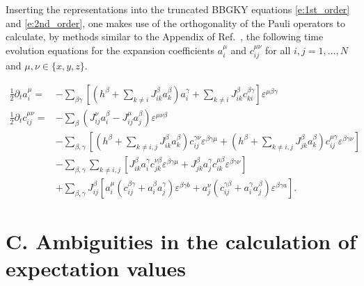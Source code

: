 \documentclass[aps,prl,showpacs,amsmath,amssymb,superscriptaddress,reprint,10pt]{revtex4-1}
\begin{document}
Inserting the representations into the truncated BBGKY equations \eqref{e:1st_order} and \eqref{e:2nd_order}, one makes use of the orthogonality of the Pauli operators to calculate, by methods similar to the Appendix of Ref.~\cite{PaskauskasKastner12}, the following time evolution equations for the expansion coefficients $a_i^\mu$ and $c_{ij}^{\mu\nu}$ for all $i,j=1,\dotsc,N$ and $\mu,\nu\in\{x,y,z\}$.
\begin{widetext}
\begin{subequations}
\begin{align}
 \frac{1}{2}\partial_t a_i^\mu=&-\sum_{\beta\gamma}\left[\left(h^\beta+\sum_{k\neq i}J_{ik}^\beta a_k^\beta\right)a_i^\gamma+\sum_{k\neq i}J_{ik}^\beta c_{ki}^{\beta\gamma}\right]\varepsilon^{\mu \beta\gamma}\label{e:1st_order_param}\\
\frac{1}{2}\partial_t c_{ij}^{\mu\nu}=&-\sum_{\beta}(J_{ij}^\nu a_i^\beta-J_{ij}^\mu a_j^\beta)\varepsilon^{\mu\nu\beta}\nonumber\\
 &-\sum_{\beta,\gamma}\left[\left(h^\beta+\sum_{k\neq i,j}J_{ik}^\beta a_k^\beta\right)c_{ij}^{\gamma\nu}\varepsilon^{\beta \gamma\mu}+\left(h^\beta+\sum_{k\neq i,j}J_{jk}^\beta a_k^\beta\right) c_{ij}^{\mu \gamma}\varepsilon^{\beta \gamma\nu}\right]\nonumber\\
 &-\sum_{\beta,\gamma}\sum_{k\neq i,j}\left[J_{ik}^\beta a_i^\gamma c_{jk}^{\nu\beta}\varepsilon^{\beta \gamma\mu}+J_{jk}^\beta a_j^\gamma c_{ik}^{\mu\beta}\varepsilon^{\beta \gamma\nu}\right]\nonumber\\
 &+\sum_{\beta,\gamma}J_{ij}^\beta \left[a_i^\mu(c_{ij}^{\beta \gamma}+a_i^\beta a_j^\gamma)\varepsilon^{\beta \gamma b}+a_j^\nu(c_{ij}^{\gamma\beta}+a_i^\gamma a_j^\beta)\varepsilon^{\beta \gamma a}\right].
\label{e:2nd_order_param}
 \end{align}
\end{subequations}
 \end{widetext}



\section{C. Ambiguities in the calculation of expectation values}
\setcounter{section}{3}
\setcounter{equation}{0}
\setcounter{figure}{0}
\end{document}
